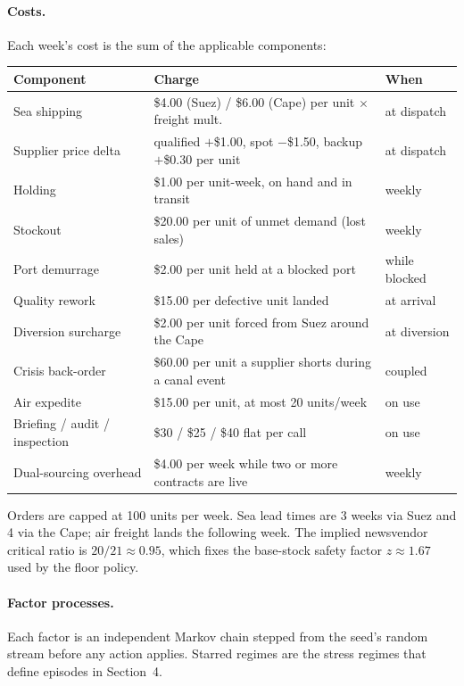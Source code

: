 \documentclass{article}
\begin{document}
\paragraph{Costs.} Each week's cost is the sum of the applicable components:

\begin{center}
\small
\begin{tabular}{lll}
\toprule
Component & Charge & When \\
\midrule
Sea shipping & \$4.00 (Suez) / \$6.00 (Cape) per unit $\times$ freight mult. & at dispatch \\
Supplier price delta & qualified $+$\$1.00, spot $-$\$1.50, backup $+$\$0.30 per unit & at dispatch \\
Holding & \$1.00 per unit-week, on hand and in transit & weekly \\
Stockout & \$20.00 per unit of unmet demand (lost sales) & weekly \\
Port demurrage & \$2.00 per unit held at a blocked port & while blocked \\
Quality rework & \$15.00 per defective unit landed & at arrival \\
Diversion surcharge & \$2.00 per unit forced from Suez around the Cape & at diversion \\
Crisis back-order & \$60.00 per unit a supplier shorts during a canal event & coupled \\
Air expedite & \$15.00 per unit, at most 20 units/week & on use \\
Briefing / audit / inspection & \$30 / \$25 / \$40 flat per call & on use \\
Dual-sourcing overhead & \$4.00 per week while two or more contracts are live & weekly \\
\bottomrule
\end{tabular}
\end{center}

Orders are capped at 100 units per week. Sea lead times are 3 weeks via
Suez and 4 via the Cape; air freight lands the following week. The implied
newsvendor critical ratio is $20/21 \approx 0.95$, which fixes the
base-stock safety factor $z \approx 1.67$ used by the floor policy.

\paragraph{Factor processes.} Each factor is an independent Markov chain
stepped from the seed's random stream before any action applies. Starred
regimes are the stress regimes that define episodes in Section~4.
\end{document}

